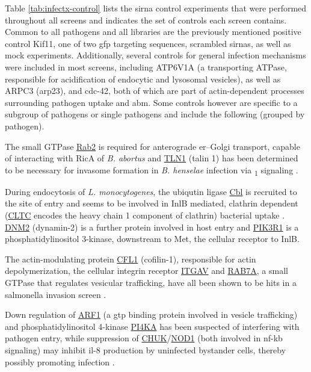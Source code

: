 Table \ref{tab:infectx-control} lists the \gls{sirna} control experiments that were performed throughout all screens and indicates the set of controls each screen contains. Common to all pathogens and all libraries are the previously mentioned positive control Kif11, one of two \gls{gfp} targeting sequences, scrambled \glspl{sirna}, as well as mock experiments. Additionally, several controls for general infection mechanisms were included in most screens, including ATP6V1A (a  transporting ATPase, responsible for acidification of endocytic and lysosomal vesicles), as well as ARPC3 (\acrshort{arp23}), and \gls{cdc-42}, both of which are part of actin-dependent processes surrounding pathogen uptake and \gls{abm}. Some controls however are specific to a subgroup of pathogens or single pathogens and include the following (grouped by pathogen).
\begin{description}[leftmargin=0.5cm]
\item[\textit{Bartonella}\slash \textit{Brucella}:] The small GTPase \hyperlink{tab:control-rab2}{Rab2} is required for anterograde \gls{er}--Golgi transport, capable of interacting with RicA of \textit{B. abortus} \citep{DeBarsy2011} and \hyperlink{tab:control-tln1}{TLN1} (talin 1) has been determined to be necessary for invasome formation in \textit{B. henselae} infection via \textbeta\textsubscript{1} signaling \citep{Truttmann2011}.
\item[\textit{Listeria}:] During endocytosis of \textit{L. monocytogenes}, the ubiqutin ligase \hyperlink{tab:control-CBL}{Cbl} is recruited to the site of entry and seems to be involved in InlB mediated, clathrin dependent (\hyperlink{tab:control-cltc}{CLTC} encodes the heavy chain 1 component of clathrin) bacterial uptake \citep{Veiga2005}. \hyperlink{tab:control-dnm2}{DNM2} (dynamin-2) is a further protein involved in host entry and \hyperlink{tab:control-pik3r1}{PIK3R1} is a phosphatidylinositol 3-kinase, downstream to Met, the cellular receptor to InlB.
\item[\textit{Salmonella}:] The actin-modulating protein \hyperlink{tab:control-cfl1}{CFL1} (cofilin-1), responsible for actin depolymerization, the cellular integrin receptor \hyperlink{tab:control-itgav}{ITGAV} and \hyperlink{tab:control-rab7a}{RAB7A}, a small GTPase that regulates vesicular trafficking, have all been shown to be hits in a salmonella invasion screen \citep{Misselwitz2011}.
\item[\textit{Shigella}:] Down regulation of \hyperlink{tab:control-arf1}{ARF1} (a \gls{gtp} binding protein involved in vesicle trafficking) and phosphatidylinositol 4-kinase \hyperlink{tab:control-pi4ka}{PI4KA} has been suspected of interfering with pathogen entry, while suppression of \hyperlink{tab:control-chuk}{CHUK}\slash \hyperlink{tab:control-nod1}{NOD1} (both involved in \gls{nf-kb} signaling) may inhibit \gls{il-8} production by uninfected bystander cells, thereby possibly promoting infection \citep{Kasper2012}. 

\end{description}
